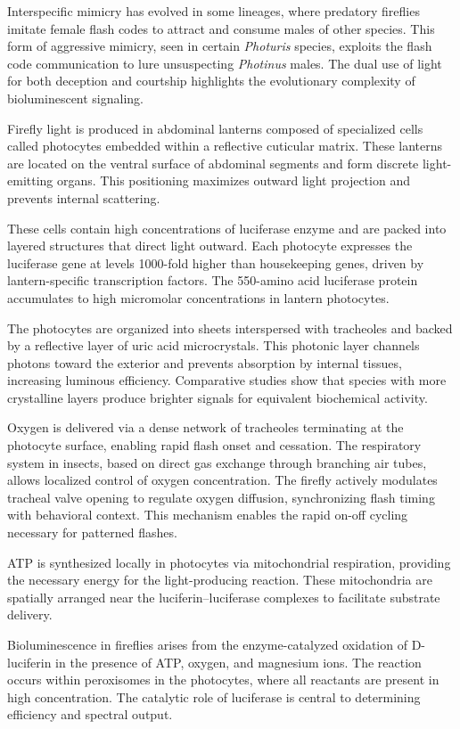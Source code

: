 Interspecific mimicry has evolved in some lineages, where predatory fireflies imitate female flash codes to attract and consume males of other species. This form of aggressive mimicry, seen in certain \emph{Photuris} species, exploits the flash code communication to lure unsuspecting \emph{Photinus} males. The dual use of light for both deception and courtship highlights the evolutionary complexity of bioluminescent signaling.

Firefly light is produced in abdominal lanterns composed of specialized cells called photocytes embedded within a reflective cuticular matrix. These lanterns are located on the ventral surface of abdominal segments and form discrete light-emitting organs. This positioning maximizes outward light projection and prevents internal scattering.

These cells contain high concentrations of luciferase enzyme and are packed into layered structures that direct light outward. Each photocyte expresses the luciferase gene at levels 1000-fold higher than housekeeping genes, driven by lantern-specific transcription factors. The 550-amino acid luciferase protein accumulates to high micromolar concentrations in lantern photocytes. 

The photocytes are organized into sheets interspersed with tracheoles and backed by a reflective layer of uric acid microcrystals. This photonic layer channels photons toward the exterior and prevents absorption by internal tissues, increasing luminous efficiency. Comparative studies show that species with more crystalline layers produce brighter signals for equivalent biochemical activity.

Oxygen is delivered via a dense network of tracheoles terminating at the photocyte surface, enabling rapid flash onset and cessation. The respiratory system in insects, based on direct gas exchange through branching air tubes, allows localized control of oxygen concentration. The firefly actively modulates tracheal valve opening to regulate oxygen diffusion, synchronizing flash timing with behavioral context. This mechanism enables the rapid on-off cycling necessary for patterned flashes.

ATP is synthesized locally in photocytes via mitochondrial respiration, providing the necessary energy for the light-producing reaction. These mitochondria are spatially arranged near the luciferin–luciferase complexes to facilitate substrate delivery.

Bioluminescence in fireflies arises from the enzyme-catalyzed oxidation of D-luciferin in the presence of ATP, oxygen, and magnesium ions. The reaction occurs within peroxisomes in the photocytes, where all reactants are present in high concentration. The catalytic role of luciferase is central to determining efficiency and spectral output.

